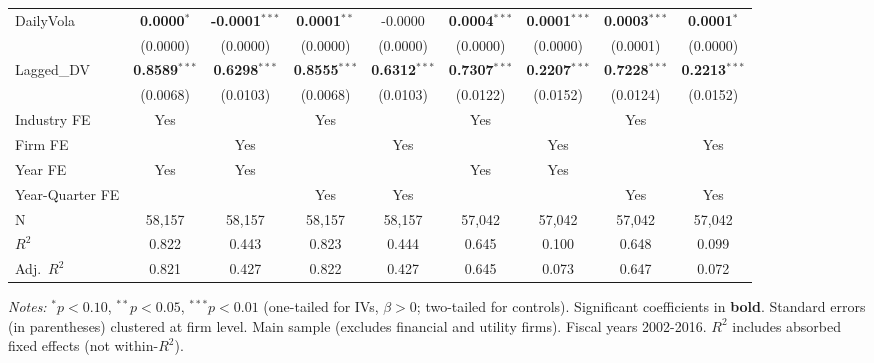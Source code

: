 \begin{landscape}
\begin{table}[H]
\begin{tabular}{lcccccccc}
DailyVola & \textbf{0.0000}$^{*}$ & \textbf{-0.0001}$^{***}$ & \textbf{0.0001}$^{**}$ & -0.0000 & \textbf{0.0004}$^{***}$ & \textbf{0.0001}$^{***}$ & \textbf{0.0003}$^{***}$ & \textbf{0.0001}$^{*}$ \\
 & (0.0000) & (0.0000) & (0.0000) & (0.0000) & (0.0000) & (0.0000) & (0.0001) & (0.0000) \\
Lagged\_DV & \textbf{0.8589}$^{***}$ & \textbf{0.6298}$^{***}$ & \textbf{0.8555}$^{***}$ & \textbf{0.6312}$^{***}$ & \textbf{0.7307}$^{***}$ & \textbf{0.2207}$^{***}$ & \textbf{0.7228}$^{***}$ & \textbf{0.2213}$^{***}$ \\
 & (0.0068) & (0.0103) & (0.0068) & (0.0103) & (0.0122) & (0.0152) & (0.0124) & (0.0152) \\
\midrule
Industry FE & Yes &  & Yes &  & Yes &  & Yes &  \\
Firm FE &  & Yes &  & Yes &  & Yes &  & Yes \\
Year FE & Yes & Yes &  &  & Yes & Yes &  &  \\
Year-Quarter FE &  &  & Yes & Yes &  &  & Yes & Yes \\
\midrule
N & 58,157 & 58,157 & 58,157 & 58,157 & 57,042 & 57,042 & 57,042 & 57,042 \\
$R^2$ & 0.822 & 0.443 & 0.823 & 0.444 & 0.645 & 0.100 & 0.648 & 0.099 \\
Adj.~$R^2$ & 0.821 & 0.427 & 0.822 & 0.427 & 0.645 & 0.073 & 0.647 & 0.072 \\
\bottomrule
\end{tabular}
\begin{minipage}{\linewidth}
\vspace{2pt}\scriptsize
\textit{Notes:} $^{*}p<0.10$, $^{**}p<0.05$, $^{***}p<0.01$ (one-tailed for IVs, $\beta > 0$; two-tailed for controls).
 Significant coefficients in \textbf{bold}.
 Standard errors (in parentheses) clustered at firm level.
 Main sample (excludes financial and utility firms). Fiscal years 2002-2016.
 $R^2$ includes absorbed fixed effects (not within-$R^2$).
\end{minipage}
\end{table}
\end{landscape}